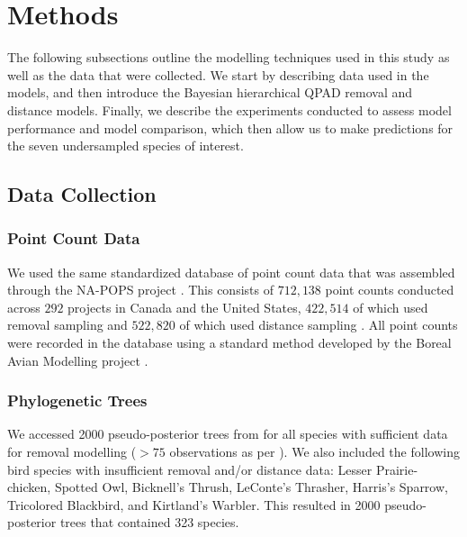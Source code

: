 \section{Methods}

\par The following subsections outline the modelling techniques used in this study as well as the data that were collected. 
We start by describing data used in the models, and then introduce the Bayesian hierarchical QPAD removal and distance models.
Finally, we describe the experiments conducted to assess model performance and model comparison, which then allow us to make predictions for the seven undersampled species of interest.

\subsection{Data Collection}
\subsubsection{Point Count Data}
\par We used the same standardized database of point count data that was assembled through the NA-POPS project \cite{edwards_point_2023}. 
This consists of $712,138$ point counts conducted across $292$ projects in Canada and the United States, $422,514$ of which used removal sampling \citep{alldredge_time--detection_2007, farnsworth_removal_2002} and $522,820$ of which used distance sampling \citep{buckland_introduction_2001, buckland_distance_2015}.
 All point counts were recorded in the database using a standard method developed by the Boreal Avian Modelling project \citep{barker_ecological_2015}.

\subsubsection{Phylogenetic Trees}
\par We accessed 2000 pseudo-posterior trees from \citet{jetz_global_2012} for all species with sufficient data for removal modelling ($>75$ observations as per \cite{edwards_point_2023,solymos_evaluating_2018,buckland_introduction_2001}). 
We also included the following bird species with insufficient removal and/or distance data: Lesser Prairie-chicken, Spotted Owl, Bicknell's Thrush, LeConte's Thrasher, Harris's Sparrow, Tricolored Blackbird, and Kirtland's Warbler. 
This resulted in 2000 pseudo-posterior trees that contained 323 species.

